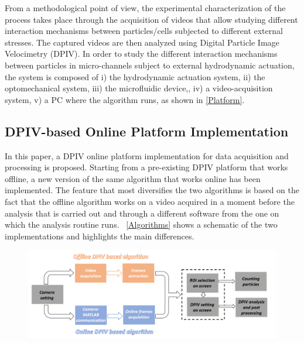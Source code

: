 \documentclass[journal]{IEEEtran}
\theoremstyle{definition}
\theoremstyle{remark}
\begin{document}
From a methodological point of view, the experimental characterization of the process takes place through the acquisition of videos that allow studying different interaction mechanisms between particles/cells subjected to different external stresses.
The captured videos are then analyzed using Digital Particle Image Velocimetry (DPIV).
In order to study the different interaction mechanisms between particles in micro-channels subject to external hydrodynamic actuation, the system is composed of i) the hydrodynamic actuation system, ii) the optomechanical system, iii) the microfluidic device,, iv) a video-acquisition system, v)  a PC where the algorithm runs, as shown in \fig\ref{Platform}.


\subsection{DPIV-based Online Platform Implementation}\label{sec:method}

In this paper, a DPIV online platform implementation for data acquisition and processing is proposed. Starting from a pre-existing DPIV platform that works offline, a new version of the same algorithm
that works online has been implemented. The feature that most diversifies the two algorithms is based on the fact that the offline algorithm works on a video acquired in a moment before the analysis that is carried out and through a different software from the one on which the analysis routine runs.
~\fig\ref{Algorithms} shows a schematic of the two implementations and highlights the main differences.



\begin{figure}[t]
	\centering
	\includegraphics[width=2\columnwidth]{images/Algorithms}
\end{figure}
\end{document}
